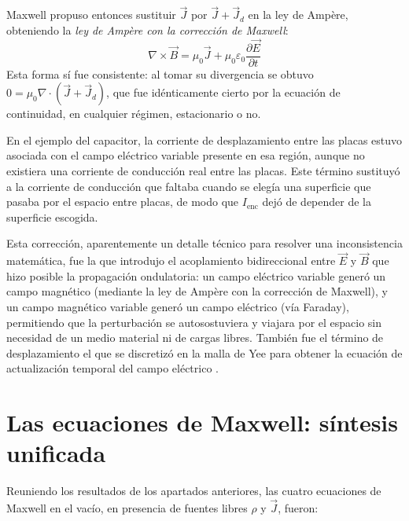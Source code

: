 Maxwell propuso entonces sustituir $\vec{J}$ por $\vec{J} + \vec{J}_d$ en la ley de Ampère, obteniendo la \textit{ley de Ampère con la corrección de Maxwell}:
\begin{equation}
    \nabla \times \vec{B} = \mu_0 \vec{J} + \mu_0 \varepsilon_0 \frac{\partial \vec{E}}{\partial t}
\end{equation}
Esta forma sí fue consistente: al tomar su divergencia se obtuvo $0 = \mu_0 \nabla \cdot (\vec{J} + \vec{J}_d)$, que fue idénticamente cierto por la ecuación de continuidad, en cualquier régimen, estacionario o no. 

En el ejemplo del capacitor, la corriente de desplazamiento entre las placas estuvo asociada con el campo eléctrico variable presente en esa región, aunque no existiera una corriente de conducción real entre las placas. Este término sustituyó a la corriente de conducción que faltaba cuando se elegía una superficie que pasaba por el espacio entre placas, de modo que $I_{\text{enc}}$ dejó de depender de la superficie escogida.

Esta corrección, aparentemente un detalle técnico para resolver una inconsistencia matemática, fue la que introdujo el acoplamiento bidireccional entre $\vec{E}$ y $\vec{B}$ que hizo posible la propagación ondulatoria: un campo eléctrico variable generó un campo magnético (mediante la ley de Ampère con la corrección de Maxwell), y un campo magnético variable generó un campo eléctrico (vía Faraday), permitiendo que la perturbación se autosostuviera y viajara por el espacio sin necesidad de un medio material ni de cargas libres. También fue el término de desplazamiento el que se discretizó en la malla de Yee para obtener la ecuación de actualización temporal del campo eléctrico \cite{Yee1966, Taflove2005}.

\section{Las ecuaciones de Maxwell: síntesis unificada}
Reuniendo los resultados de los apartados anteriores, las cuatro ecuaciones de Maxwell en el vacío, en presencia de fuentes libres $\rho$ y $\vec{J}$, fueron:


